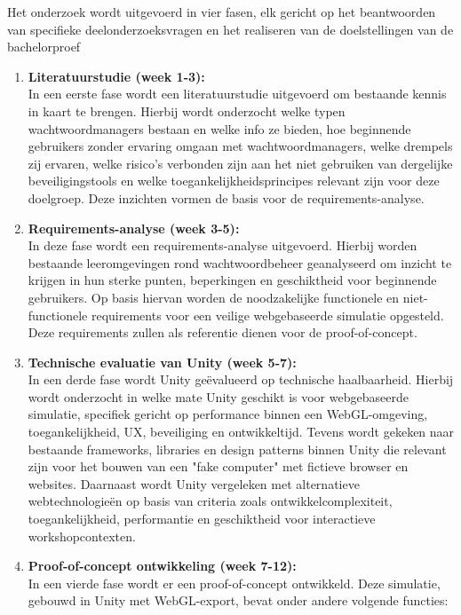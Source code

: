 Het onderzoek wordt uitgevoerd in vier fasen, elk gericht op het beantwoorden van specifieke deelonderzoeksvragen en het realiseren van de doelstellingen van de bachelorproef

\begin{enumerate}
    \item \textbf{Literatuurstudie (week 1-3):} \\
    In een eerste fase wordt een literatuurstudie uitgevoerd om bestaande kennis in kaart te brengen. Hierbij wordt onderzocht welke typen wachtwoordmanagers bestaan en welke info ze bieden, hoe beginnende gebruikers zonder ervaring omgaan met wachtwoordmanagers, welke drempels zij ervaren, welke risico's verbonden zijn aan het niet gebruiken van dergelijke beveiligingstools en welke toegankelijkheidsprincipes relevant zijn voor deze doelgroep. Deze inzichten vormen de basis voor de requirements-analyse.
    \item \textbf{Requirements-analyse (week 3-5):} \\
    In deze fase wordt een requirements-analyse uitgevoerd. Hierbij worden bestaande leeromgevingen rond wachtwoordbeheer geanalyseerd om inzicht te krijgen in hun sterke punten, beperkingen en geschiktheid voor beginnende gebruikers. Op basis hiervan worden de noodzakelijke functionele en niet-functionele requirements voor een veilige webgebaseerde simulatie opgesteld. Deze requirements zullen als referentie dienen voor de proof-of-concept.
    \item \textbf{Technische evaluatie van Unity (week 5-7):} \\
    In een derde fase wordt Unity geëvalueerd op technische haalbaarheid. Hierbij wordt onderzocht in welke mate Unity geschikt is voor webgebaseerde simulatie, specifiek gericht op performance binnen een WebGL-omgeving, toegankelijkheid, UX, beveiliging en ontwikkeltijd. Tevens wordt gekeken naar bestaande frameworks, libraries en design patterns binnen Unity die relevant zijn voor het bouwen van een "fake computer" met fictieve browser en websites. 
    Daarnaast wordt Unity vergeleken met alternatieve webtechnologieën op basis van criteria zoals ontwikkelcomplexiteit, toegankelijkheid, performantie en geschiktheid voor interactieve workshopcontexten.
    \item \textbf{Proof-of-concept ontwikkeling (week 7-12):} \\
    In een vierde fase wordt er een proof-of-concept ontwikkeld. Deze simulatie, gebouwd in Unity met WebGL-export, bevat onder andere volgende functies:

\end{enumerate}
